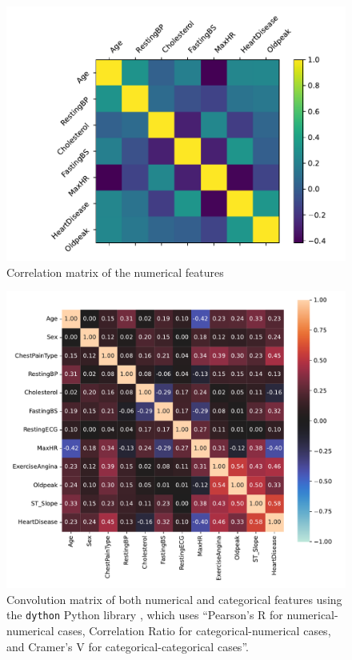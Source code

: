 \begin{figure}
    \centering
    \includegraphics[width=1\columnwidth]{images/numerical_correlations.pdf}
    \caption{Correlation matrix of the numerical features}
    \label{fig:numerical_correlations}
\end{figure}
\begin{figure}
    \centering
    \includegraphics[width=1\columnwidth]{images/all_correlations.pdf}
    \caption{Convolution matrix of both numerical and categorical features using the \texttt{dython} Python library \cite{zychlinskiDython2023}, which uses ``Pearson's R for numerical-numerical cases, Correlation Ratio for categorical-numerical cases, and Cramer's V for categorical-categorical cases''.}
    \label{fig:all_correlations}
\end{figure}
